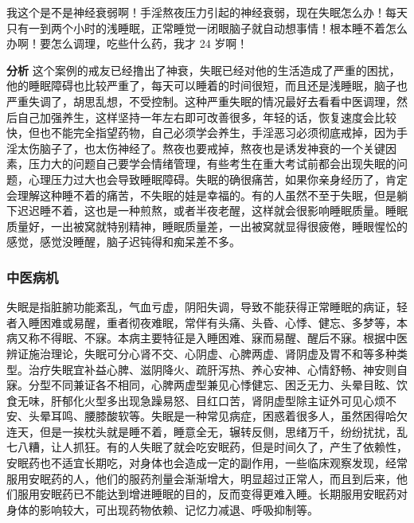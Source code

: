 \begin{case}
    我这个是不是神经衰弱啊！手淫熬夜压力引起的神经衰弱，现在失眠怎么办！每天只有一到两个小时的浅睡眠，正常睡觉一闭眼脑子就自动想事情！根本睡不着怎么办啊！要怎么调理，吃些什么药，我才 24 岁啊！

    \textbf{分析} 这个案例的戒友已经撸出了神衰，失眠已经对他的生活造成了严重的困扰，他的睡眠障碍也比较严重了，每天可以睡着的时间很短，而且还是浅睡眠，脑子也严重失调了，胡思乱想，不受控制。这种严重失眠的情况最好去看看中医调理，然后自己加强养生，这样坚持一年左右即可改善很多，年轻的话，恢复速度会比较快，但也不能完全指望药物，自己必须学会养生，手淫恶习必须彻底戒掉，因为手淫太伤脑子了，也太伤神经了。熬夜也要戒掉，熬夜也是诱发神衰的一个关键因素，压力大的问题自己要学会情绪管理，有些考生在重大考试前都会出现失眠的问题，心理压力过大也会导致睡眠障碍。失眠的确很痛苦，如果你亲身经历了，肯定会理解这种睡不着的痛苦，不失眠的娃是幸福的。有的人虽然不至于失眠，但是躺下迟迟睡不着，这也是一种煎熬，或者半夜老醒，这样就会很影响睡眠质量。睡眠质量好，一出被窝就特别精神，睡眠质量差，一出被窝就显得很疲倦，睡眼惺忪的感觉，感觉没睡醒，脑子迟钝得和痴呆差不多。
\end{case}

\subsubsection{中医病机}

失眠是指脏腑功能紊乱，气血亏虚，阴阳失调，导致不能获得正常睡眠的病证，轻者入睡困难或易醒，重者彻夜难眠，常伴有头痛、头昏、心悸、健忘、多梦等，本病又称不得眠、不寐。本病主要特征是入睡困难、寐而易醒、醒后不寐。根据中医辨证施治理论，失眠可分心肾不交、心阴虚、心脾两虚、肾阴虚及胃不和等多种类型。治疗失眠宜补益心脾、滋阴降火、疏肝泻热、养心安神、心情舒畅、神安则自寐。分型不同兼证各不相同，心脾两虚型兼见心悸健忘、困乏无力、头晕目眩、饮食无味，肝郁化火型多出现急躁易怒、目红口苦，肾阴虚型除主证外可见心烦不安、头晕耳鸣、腰膝酸软等。失眠是一种常见病症，困惑着很多人，虽然困得哈欠连天，但是一挨枕头就是睡不着，睡意全无，辗转反侧，思绪万千，纷纷扰扰，乱七八糟，让人抓狂。有的人失眠了就会吃安眠药，但是时间久了，产生了依赖性，安眠药也不适宜长期吃，对身体也会造成一定的副作用，一些临床观察发现，经常服用安眠药的人，他们的服药剂量会渐渐增大，明显超过正常人，而且到后来，他们服用安眠药已不能达到增进睡眠的目的，反而变得更难入睡。长期服用安眠药对身体的影响较大，可出现药物依赖、记忆力减退、呼吸抑制等。

